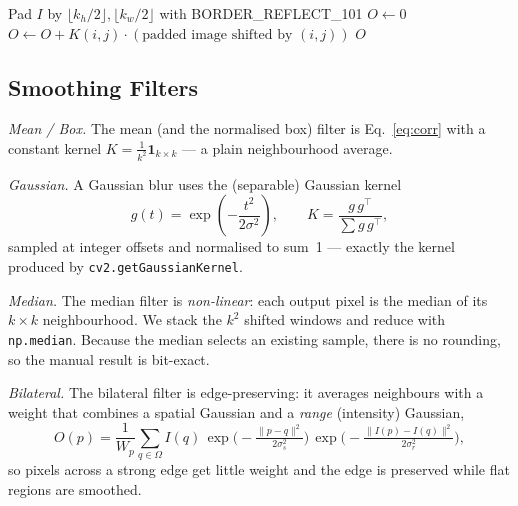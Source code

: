 \documentclass[a4paper,11pt]{article}
\newcommand{\runin}[1]{\par\medskip\noindent\textit{#1}\hspace{0.4em}\ignorespaces}
\begin{document}
\begin{algorithm}[H]
\caption{Manual 2D correlation (matches \texttt{cv2.filter2D})}
\label{alg:corr}
\begin{algorithmic}[1]
\State Pad $I$ by $\lfloor k_h/2\rfloor,\lfloor k_w/2\rfloor$ with BORDER\_REFLECT\_101
\State $O \gets 0$
  \State $O \gets O + K(i,j)\cdot(\text{padded image shifted by }(i,j))$
\EndFor
\State \Return $O$
\end{algorithmic}
\end{algorithm}

\subsection{Smoothing Filters}
\runin{Mean / Box.} The mean (and the normalised box) filter is Eq.~\eqref{eq:corr}
with a constant kernel $K=\tfrac{1}{k^2}\mathbf{1}_{k\times k}$ --- a plain
neighbourhood average.

\runin{Gaussian.} A Gaussian blur uses the (separable) Gaussian kernel
\begin{equation}
g(t)=\exp\!\left(-\frac{t^2}{2\sigma^2}\right),\qquad
K = \frac{g\,g^{\!\top}}{\sum g\,g^{\!\top}},
\label{eq:gauss}
\end{equation}
sampled at integer offsets and normalised to sum~1 --- exactly the kernel produced
by \texttt{cv2.getGaussianKernel}.

\runin{Median.} The median filter is \emph{non-linear}: each output pixel is the
median of its $k\times k$ neighbourhood. We stack the $k^2$ shifted windows and
reduce with \texttt{np.median}. Because the median selects an existing sample, there
is no rounding, so the manual result is bit-exact.

\runin{Bilateral.} The bilateral filter is edge-preserving: it averages neighbours
with a weight that combines a spatial Gaussian and a \emph{range} (intensity) Gaussian,
\begin{equation}
O(p)=\frac{1}{W_p}\sum_{q\in\Omega} I(q)\,
\exp\!\Big(\!-\tfrac{\lVert p-q\rVert^2}{2\sigma_s^2}\Big)\,
\exp\!\Big(\!-\tfrac{\lVert I(p)-I(q)\rVert^2}{2\sigma_r^2}\Big),
\label{eq:bilat}
\end{equation}
so pixels across a strong edge get little weight and the edge is preserved while
flat regions are smoothed.
\end{document}
